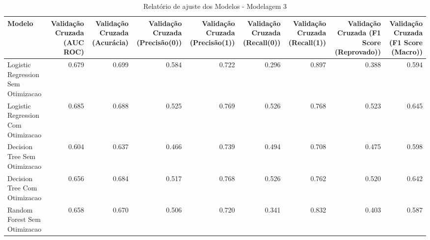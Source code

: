 \begin{table}[H] %
    \centering
    \caption{Relatório de ajuste dos Modelos - Modelagem 3}
    \label{tab:relatorio_ajuste_modelagem_3}
    \renewcommand{\arraystretch}{1.25} %
    \begin{adjustwidth}{ -1in }{ -1in } %
    \centering %
    \small %
    \begin{tabular}{lrrrrrrrr}
\toprule
                            Modelo &  Validação Cruzada (AUC ROC) &  Validação Cruzada (Acurácia) &  Validação Cruzada (Precisão(0)) &  Validação Cruzada (Precisão(1)) &  Validação Cruzada (Recall(0)) &  Validação Cruzada (Recall(1)) &  Validação Cruzada (F1 Score (Reprovado)) &  Validação Cruzada (F1 Score (Macro)) \\
\midrule
Logistic Regression Sem Otimizacao &                        0.679 &                         0.699 &                            0.584 &                            0.722 &                          0.296 &                          0.897 &                                     0.388 &                                 0.594 \\
Logistic Regression Com Otimizacao &                        0.685 &                         0.688 &                            0.525 &                            0.769 &                          0.526 &                          0.768 &                                     0.523 &                                 0.645 \\
      Decision Tree Sem Otimizacao &                        0.604 &                         0.637 &                            0.466 &                            0.739 &                          0.494 &                          0.708 &                                     0.475 &                                 0.598 \\
      Decision Tree Com Otimizacao &                        0.656 &                         0.684 &                            0.517 &                            0.768 &                          0.526 &                          0.762 &                                     0.520 &                                 0.642 \\
      Random Forest Sem Otimizacao &                        0.658 &                         0.670 &                            0.506 &                            0.720 &                          0.341 &                          0.832 &                                     0.403 &                                 0.587 \\

\end{tabular}
\end{adjustwidth}
\end{table}
